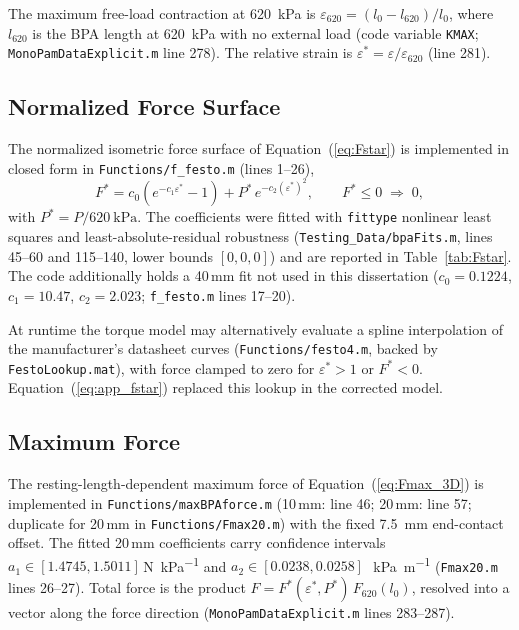 The maximum free-load contraction at \qty{620}{\kPa} is
$\varepsilon_{620} = (l_{0}-l_{620})/l_{0}$, where $l_{620}$ is the BPA length at
\qty{620}{\kPa} with no external load (code variable \texttt{KMAX};
\texttt{MonoPamDataExplicit.m} line 278). The relative strain is
$\varepsilon^{*} = \varepsilon / \varepsilon_{620}$ (line 281).

\subsection{Normalized Force Surface}
The normalized isometric force surface of Equation~(\ref{eq:Fstar}) is implemented
in closed form in \texttt{Functions/f\_festo.m} (lines 1--26),
\begin{equation}
    F^{*} = c_{0}\left(e^{-c_{1}\varepsilon^{*}} - 1\right)
            + P^{*}\,e^{-c_{2}(\varepsilon^{*})^{2}},
    \qquad F^{*}\le 0 \;\Rightarrow\; 0,
    \label{eq:app_fstar}
\end{equation}
with $P^{*} = P/\qty{620}{\kPa}$. The coefficients were fitted with
\texttt{fittype} nonlinear least squares and least-absolute-residual robustness
(\texttt{Testing\_Data/bpaFits.m}, lines 45--60 and 115--140, lower bounds
$[0,0,0]$) and are reported in Table~\ref{tab:Fstar}. The code additionally holds a
40\,mm fit not used in this dissertation ($c_0 = 0.1224$, $c_1 = 10.47$,
$c_2 = 2.023$; \texttt{f\_festo.m} lines 17--20).

At runtime the torque model may alternatively evaluate a spline interpolation of
the manufacturer's datasheet curves (\texttt{Functions/festo4.m}, backed by
\texttt{FestoLookup.mat}), with force clamped to zero for $\varepsilon^{*}>1$ or
$F^{*}<0$. Equation~(\ref{eq:app_fstar}) replaced this lookup in the corrected
model.

\subsection{Maximum Force}
The resting-length-dependent maximum force of Equation~(\ref{eq:Fmax_3D}) is
implemented in \texttt{Functions/maxBPAforce.m} (10\,mm: line 46; 20\,mm: line 57;
duplicate for 20\,mm in \texttt{Functions/Fmax20.m}) with the fixed
\qty{7.5}{\mm} end-contact offset. The fitted 20\,mm coefficients carry confidence
intervals $a_1 \in [1.4745, 1.5011]$\,\si{\N\per\kPa} and
$a_2 \in [0.0238, 0.0258]$\,\si{\per\kPa\per\metre}
(\texttt{Fmax20.m} lines 26--27). Total force is the product
$F = F^{*}(\varepsilon^{*},P^{*})\,F_{620}(l_{0})$, resolved into a vector along the
force direction (\texttt{MonoPamDataExplicit.m} lines 283--287).

